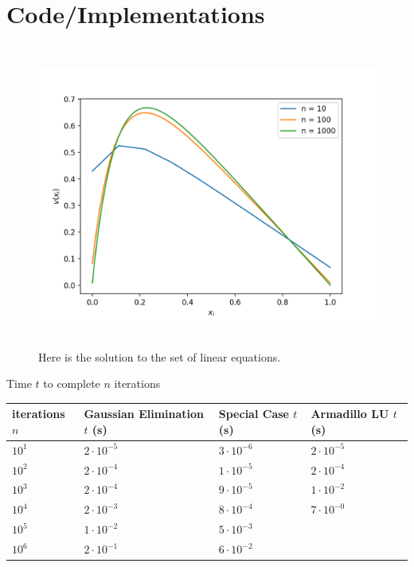 \documentclass[%
oneside,                 %
final,                   %
10pt]{article}
\begin{document}
\newpage

\section{Code/Implementations}

\newpage

\begin{figure}[h]
\begin{center}
\includegraphics[width=12cm,height=10cm]{pro1.png}
\caption{Here is the solution to the set of linear equations.}
\label{Serie}
\end{center}
\end{figure}


Time $t$ to complete $n$ iterations

\begin{center}
    \begin{tabular}{| l | l | l | l |}
    \hline
    \textbf{iterations $n$} & \textbf{Gaussian Elimination $t$ (s)} & \textbf{Special Case $t$ (s)} & \textbf{Armadillo LU $t$ (s)} \\
    \hline
    $10^1$ & $2 \cdot 10^{-5}$ & $3 \cdot 10^{-6}$ & $2 \cdot 10^{-5}$ \\ 
    \hline
    $10^2$ & $2 \cdot 10^{-4} $ & $1 \cdot 10^{-5} $ &  $2 \cdot 10^{-4}$ \\
    \hline
    $10^3$ & $ 2 \cdot 10^{-4} $ & $9 \cdot 10^{-5}$ & $1 \cdot 10^{-2} $ \\
    \hline
    $10^4$ & $ 2 \cdot 10^{-3} $ & $8 \cdot 10^{-4} $ & $ 7 \cdot 10^{-0}$ \\
    \hline
    $10^5$ & $ 1 \cdot 10^{-2} $ & $ 5 \cdot 10^{-3}$ &  \\
    \hline
    $10^6$ & $2 \cdot 10^{-1}$ & $6 \cdot 10^{-2}$ & \\
    \hline
    
    \end{tabular}
\end{center}
\end{document}
